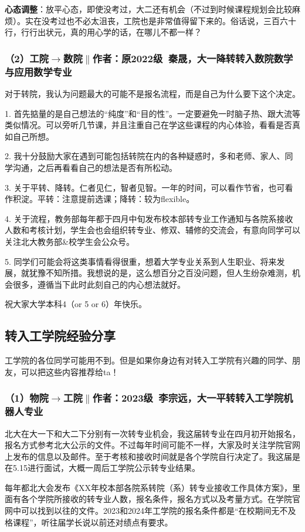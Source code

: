 \documentclass[11pt,oneside]{book}
\begin{document}
\textbf{\textbf{心态调整}}：放平心态，即使没考过，大二还有机会（不过到时候课程规划会比较麻烦）。实在没考过也不必太沮丧，工院也是非常值得留下来的。俗话说，三百六十行，行行出状元，真的用心学的话，在哪儿不都一样？

\subsubsection{（2）工院$\to$数院$\parallel$作者：原2022级\ 秦晟，大一降转转入数院数学与应用数学专业}
对于转院，我认为问题最大的可能不是报名流程，而是自己为什么要下这个决定。

1. 首先掂量的是自己想法的“纯度”和“目的性”。一定要避免一时脑子热、跟大流等类似情况。可以旁听几节课，并且注重自己在学这些课程的内心体验，看看是否真如自己所想。

2. 我十分鼓励大家在遇到可能包括转院在内的各种疑惑时，多和老师、家人、同学沟通，之后再看看自己的想法是否有所松动。

3. 关于平转、降转。仁者见仁，智者见智。一年的时间，可以看作节省，也可看作积淀。平转：注意提前选课；降转：较为flexible。

4. 关于流程，教务部每年都于四月中旬发布校本部转专业工作通知与各院系接收人数和考核计划，学生会也会组织转专业、修双、辅修的交流会，有意向同学可以关注北大教务部\&校学生会公众号。

5. 同学们可能会将这类事情看得很重，想着大学专业关系到人生职业、将来发展，就犹豫不知所措。我想说的是，这么想百分之百没问题，但人生纷杂难测，机会很多，遵循当下此时此刻自己的内心想法就好。

祝大家大学本科4（or 5 or 6）年快乐。


\subsection{转入工学院经验分享}
工学院的各位同学可能用不到。但是如果你身边有对转入工学院有兴趣的同学、朋友，可以把这些内容推荐给ta！
\subsubsection{（1）物院$\to$工院$\parallel$作者：2023级\ 李宗远，大一平转转入工学院机器人专业}
北大在大一下和大二下分别有一次转专业机会，我这届转专业在四月初开始报名，报名方式参考北大公示的文件。不过每年时间可能不一样，大家及时关注学院官网上发布的信息以及邮件。至于考核和接收时间就是各个学院自行决定了。我这届是在5.15进行面试，大概一周后工学院公示转专业结果。

每年都北大会发布《XX年校本部各院系转院（系）转专业接收工作具体方案》，里面有各个学院所接收的转专业人数，报名条件，报名方式以及考量方式。在学院官网中可以找到以往的文件。2023和2024年工学院的报名条件都是“在校期间无不及格课程”，听往届学长说以前还对绩点有要求。
\end{document}
